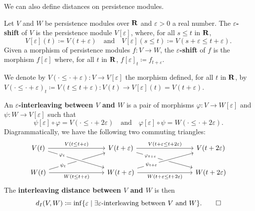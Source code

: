 We can also define distances on persistence modules.

\begin{definition}
  Let $V$ and $W$ be persistence modules over $\mathbf{R}$ and $\varepsilon > 0$ a real number. The \textbf{$\varepsilon$-shift} of $V$ is the persistence module $V[\varepsilon]$, where, for all $s \leq t$ in $\mathbf{R}$,
  \[
    V[\varepsilon](t) \coloneq V(t + \varepsilon)
    \quad \text{and} \quad
    V[\varepsilon](s \leq t) \coloneq V(s + \varepsilon \leq t + \varepsilon).
  \]
  Given a morphism of persistence modules $f \colon V \to W$, the \textbf{$\varepsilon$-shift} of $f$ is the morphism $f[\varepsilon]$ where, for all $t$ in $\mathbf{R}$, $f[\varepsilon]_t \coloneq f_{t + \varepsilon}$.
  
  We denote by $V(\cdot \leq \cdot + \varepsilon) \colon V \to V[\varepsilon]$ the morphism defined, for all $t$ in $\mathbf{R}$, by $V(\cdot \leq \cdot + \varepsilon)_t \coloneq V(t \leq t + \varepsilon) \colon V(t) \to V[\varepsilon](t) = V(t + \varepsilon)$.
  
  An \textbf{$\varepsilon$-interleaving between $V$ and $W$} is a pair of morphisms $\varphi \colon V \to W[\varepsilon]$ and $\psi \colon W \to V[\varepsilon]$ such that
  \[
    \psi[\varepsilon] \circ \varphi = V(\cdot \leq \cdot + 2\varepsilon)
    \quad \text{and} \quad
    \varphi[\varepsilon] \circ \psi = W(\cdot \leq \cdot + 2\varepsilon).
  \]
  Diagrammatically, we have the following two commuting triangles:
  \[
  \begin{tikzcd}[column sep=8em]
    V(t)
      \arrow[r, "{V(t \leq t + \varepsilon)}"]
    & V(t + \varepsilon)
      \arrow[r, "{V(t + \varepsilon \leq t + 2\varepsilon)}"]
      \arrow[dr, "\varphi_{t + \varepsilon}"{near start, description}]
    & V(t + 2\varepsilon)
  \\
    W(t)
      \arrow[r, "{W(t \leq t + \varepsilon)}"{swap}]
      \arrow[ur, "\psi_t"{near start, description}]
      \arrow[from=u, to=r, crossing over, crossing over clearance=1ex, "\varphi_t"{near start, description}]
    & W(t + \varepsilon)
      \arrow[r, "{W(t + \varepsilon \leq t + 2\varepsilon)}" swap]
      \arrow[ur, crossing over, crossing over clearance=1ex, "\psi_{t + \varepsilon}"{near start, description}]
    & W(t + 2\varepsilon)
  \end{tikzcd}
  \]
  The \textbf{interleaving distance between $V$ and $W$} is then
  \[
    d_I(V, W) \coloneq \inf\{\varepsilon \mid \exists \text{$\varepsilon$-interleaving between $V$ and $W$}\}.
    \qedhere
  \]
\end{definition}

